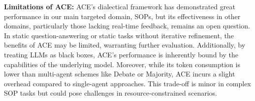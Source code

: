 \textbf{Limitations of ACE:}
ACE's dialectical framework has demonstrated great performance in our main targeted domain, SOPs, but its effectiveness in other domains, particularly those lacking real-time feedback, remains an open question. In static question-answering or static tasks without iterative refinement, the benefits of ACE may be limited, warranting further evaluation. Additionally, by treating LLMs as black boxes, ACE's performance is inherently bound by the capabilities of the underlying model. Moreover, while its token consumption is lower than multi-agent schemes like Debate or Majority, ACE incurs a slight overhead compared to single-agent approaches. This trade-off is minor in complex SOP tasks but could pose challenges in resource-constrained scenarios.

